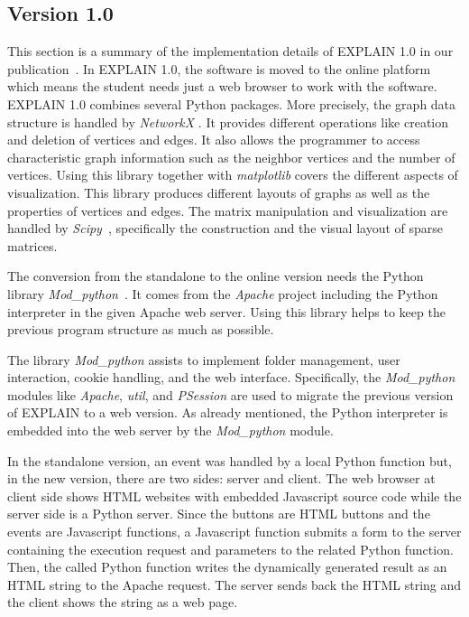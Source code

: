 \documentclass[12pt, twoside,a4paper,toc=bibliography]{scrbook}
\begin{document}
\subsection{Version 1.0}
\label{s.impl.explain1}
This section is a summary of the implementation details 
of EXPLAIN 1.0 in our publication~\cite{2013:05}.
In EXPLAIN 1.0, the software is moved to the online platform which means the student needs just a web browser to work with the software.
EXPLAIN 1.0 combines several Python packages. More precisely, the graph data structure is handled by \textit{NetworkX} \cite{networkx2008}. It provides different operations like creation and deletion of vertices and edges. It also allows the programmer to access characteristic graph information such as the neighbor vertices and the number of vertices. Using this library together with \textit{matplotlib} \cite{matplotlib2007} covers the different aspects of visualization. This library produces different layouts of graphs as well as the properties of vertices and edges. The matrix manipulation and visualization are handled by \textit{Scipy}~\cite{scipy2001}, specifically the construction and the visual layout of sparse matrices.

The conversion from the standalone to the online version needs the Python library \textit{Mod\_python}~\cite{modpython2013}. It comes from the \textit{Apache} project including the Python interpreter in the given Apache web server. Using this library helps to keep the previous program structure as much as possible.

The library \textit{Mod\_python} assists to implement folder management, user interaction, cookie handling, and the web interface. Specifically, the \textit{Mod\_python} modules like \textit{Apache}, \textit{util}, and \textit{PSession} are used to migrate the previous version of \mbox{EXPLAIN} to a web version. As already mentioned, the Python interpreter is embedded into the web server by the \textit{Mod\_python} module.

In the standalone version, an event was handled by a local Python function but, in the new version, there are two sides: server and client. The web browser at client side shows HTML websites with embedded Javascript source code while the server side is a Python server. Since the buttons are HTML buttons and the events are Javascript functions, a Javascript function submits a form to the server containing the execution request and parameters to the related Python function. Then, the called Python function writes the dynamically generated result as an HTML string to the Apache request. The server sends back the HTML string and the client shows the string as a web
page.
\end{document}
